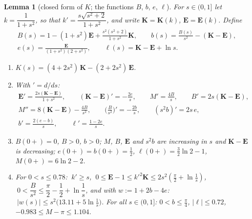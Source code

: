 \documentclass[11pt,a4paper]{article}
\theoremstyle{plain}
\newtheorem{lemma}[theorem]{Lemma}
\theoremstyle{definition}
\numberwithin{equation}{section}
\begin{document}
\begin{lemma}[closed form of $K$; the functions $B$, $b$, $e$, $\ell$]\label{lem:Kclosed}
For $s\in(0,1]$ let $k=\dfrac1{1+s^2}$, so that $k'=\dfrac{s\sqrt{s^2+2}}{1+s^2}$, and write $\mathbf K=\mathbf K(k)$, $\mathbf E=\mathbf E(k)$. Define
\begin{gather*}
B(s)=1-(1+s^2)\mathbf E+\frac{s^2(s^2+2)}{1+s^2}\mathbf K,\qquad b(s)=\frac{B(s)}{s^2}-(\mathbf K-\mathbf E),\\
e(s)=\frac{\mathbf E}{(1+s^2)(2+s^2)},\qquad\ell(s)=\mathbf K-\mathbf E+\ln s .
\end{gather*}
\begin{enumerate}
\item[(a)] $K(s)=(4+2s^2)\,\mathbf K-(2+2s^2)\,\mathbf E$.
\item[(b)] With $'=d/ds$:
\begin{gather*}
\mathbf E'=\frac{2s(\mathbf K-\mathbf E)}{1+s^2},\qquad(\mathbf K-\mathbf E)'=-\frac{2e}{s},\qquad M'=\frac{4B}{s},\qquad B'=2s(\mathbf K-\mathbf E),\\
M''=8(\mathbf K-\mathbf E)-\frac{4B}{s^2},\qquad
\Big(\frac{B}{s^2}\Big)'=-\frac{2b}{s},\qquad(s^2b)'=2s\,e,\\ b'=\frac{2(e-b)}{s},\qquad\ell'=\frac{1-2e}{s}.
\end{gather*}
\item[(c)] $B(0+)=0$, $B>0$, $b>0$; $M$, $B$, $\mathbf E$ and $s^2b$ are increasing in $s$ and $\mathbf K-\mathbf E$ is decreasing; $e(0+)=b(0+)=\frac12$, $\ell(0+)=\frac32\ln2-1$, $M(0+)=6\ln2-2$.
\item[(d)] For $0<s\le0.78$: $\ k'\ge s$, $\ 0\le\mathbf E-1\le k'^2\mathbf K\le2s^2(\frac\pi2+\ln\frac1s)$, $\ 0<\dfrac{B}{s^2}\le\dfrac\pi2-\dfrac12+\ln\dfrac1s$, and with $w:=1+2b-4e$: $\ |w(s)|\le s^2\big(13.11+5\ln\frac1s\big)$. For all $s\in(0,1]$: $0<b\le\frac\pi4$, $|\ell|\le0.72$, $-0.983\le M-\pi\le1.104$.
\end{enumerate}
\end{lemma}
\end{document}
